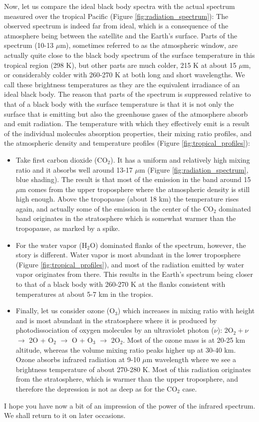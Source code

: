 \documentclass[12pt]{book}
\begin{document}
Now, let us compare the ideal black body spectra with the actual spectrum measured over the tropical Pacific (Figure \ref{fig:radiation_spectrum}): The observed spectrum is indeed far from ideal, which is a consequence of the atmosphere being between the satellite and the Earth's surface. Parts of the spectrum (10-13 $\mu$m), sometimes referred to as the atmospheric window, are actually quite close to the black body spectrum of the surface temperature in this tropical region (298 K), but other parts are much colder, 215 K at about 15 $\mu$m, or considerably colder with 260-270 K at both long and short wavelengths. We call these brightness temperatures as they are the equivalent irradiance of an ideal black body.
The reason that parts of the spectrum is suppressed relative to that of a black body with the surface temperature is that it is not only the surface that is emitting but also the greenhouse gases of the atmosphere absorb and emit radiation. The temperature with which they effectively emit is a result of the individual molecules absorption properties, their mixing ratio profiles, and the atmospheric density and temperature profiles (Figure \ref{fig:tropical_profiles}):
\begin{itemize}
\item
Take first carbon dioxide (CO$_2$). It has a uniform and relatively high mixing ratio and it absorbs well around 13-17 $\mu$m (Figure \ref{fig:radiation_spectrum}, blue shading). The result is that most of the emission in the band around 15 $\mu$m comes from the upper troposphere where the atmospheric density is still high enough. Above the tropopause (about 18 km) the temperature rises again, and actually some of the emission in the center of the CO$_2$ dominated band originates in the stratosphere which is somewhat warmer than the tropopause, as marked by a spike. 
\item
For the water vapor (H$_2$O) dominated flanks of the spectrum, however, the story is different. Water vapor is most abundant in the lower troposphere (Figure \ref{fig:tropical_profiles}), and most of the radiation emitted by water vapor originates from there. This results in the Earth's spectrum being closer to that of a black body with 260-270 K at the flanks consistent with temperatures at about 5-7 km in the tropics.
\item
Finally, let us consider ozone (O$_3$) which increases in mixing ratio with height and is most abundant in the stratosphere where it is produced by photodissociation of oxygen molecules by an ultraviolet photon ($\nu$): 2O$_2 +\nu$ $\rightarrow$ 2O + O$_2$ $\rightarrow$ O + O$_3$ $\rightarrow$ 2O$_2$. Most of the ozone mass is at 20-25 km altitude, whereas the volume mixing ratio peaks higher up at 30-40 km. Ozone absorbs infrared radiation at 9-10 $\mu$m wavelength where we see a brightness temperature of about 270-280 K. Most of this radiation originates from the stratosphere, which is warmer than the upper troposphere, and therefore the depression is not as deep as for the CO$_2$ case.
\end{itemize}
I hope you have now a bit of an impression of the power of the infrared spectrum. We shall return to it on later occasions. 
\end{document}
